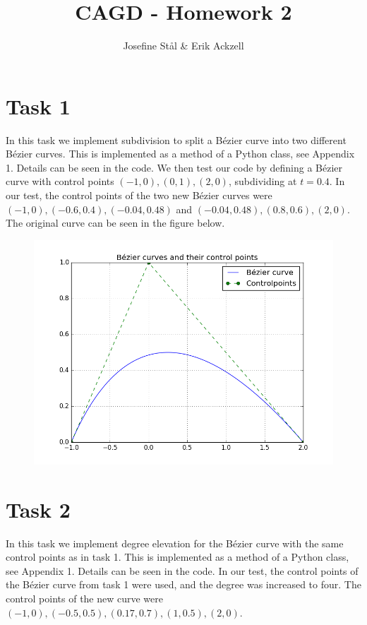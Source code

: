 \documentclass[]{article}
\title{CAGD - Homework 2}
\author{Josefine St{\aa}l \& Erik Ackzell}
\begin{document}
\maketitle
\section*{Task 1}
In this task we implement subdivision to split a Bézier curve into two different Bézier curves. This is implemented as a method of a Python class, see Appendix 1. Details can be seen in the code. We then test our code by defining a Bézier curve with control points $(-1, 0), (0, 1), (2, 0)$, subdividing at $t=0.4$. In our test, the control points of the two new Bézier curves were $(-1, 0), (-0.6, 0.4), (-0.04, 0.48)$ and $(-0.04, 0.48), (0.8, 0.6), (2, 0)$. The original curve can be seen in the figure below.
\begin{figure}[h!]
	\includegraphics[scale=0.6]{beziercurvefig}
\end{figure}

\section*{Task 2}
In this task we implement degree elevation for the Bézier curve with the same control points as in task 1. This is implemented as a method of a Python class, see Appendix 1. Details can be seen in the code. In our test, the control points of the Bézier curve from task 1 were used, and the degree was increased to four. The control points of the new curve were $(-1, 0), (-0.5, 0.5), (0.17, 0.7), (1, 0.5), (2, 0)$.
\end{document}
